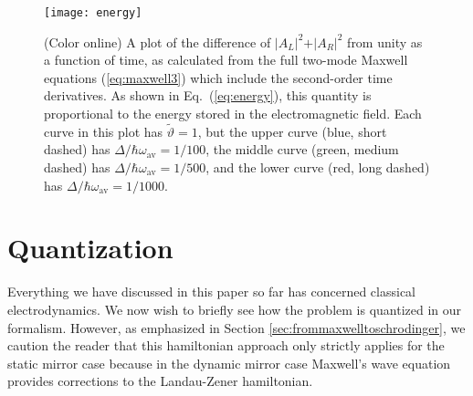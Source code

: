 \documentclass[twocolumn,english,pra,aps,superscriptaddress,floatfix]{revtex4-1}
\begin{document}
\begin{figure}
\texttt{[image: energy]}
\caption{(Color online) A plot of the difference of $\vert A_{L} \vert^2+\vert A_{R} \vert^2$ from unity as a function of time, as calculated from the full two-mode Maxwell equations (\ref{eq:maxwell3}) which include the second-order time derivatives. As shown in Eq.\ (\ref{eq:energy}), this quantity is proportional to the energy stored in the electromagnetic field. Each curve in this plot has  $\tilde{\vartheta}=1$, but the upper curve (blue, short dashed) has $\Delta/\hbar \omega_{\mathrm{av}}=1/100$, the middle curve (green, medium dashed) has $\Delta/\hbar \omega_{\mathrm{av}}=1/500$, and the lower curve (red, long dashed) has $\Delta/\hbar \omega_{\mathrm{av}}=1/1000$.}
\label{fig:energy}
\end{figure}


\section{Quantization}
\label{sec:quantization}

Everything we have discussed in this paper so far has concerned classical electrodynamics. We now wish to briefly see how the problem is quantized in our formalism. However, as emphasized in Section \ref{sec:frommaxwelltoschrodinger}, we caution the reader that this hamiltonian approach only strictly applies for the static mirror case because in the dynamic mirror case Maxwell's wave equation provides corrections to the Landau-Zener hamiltonian.
\end{document}
